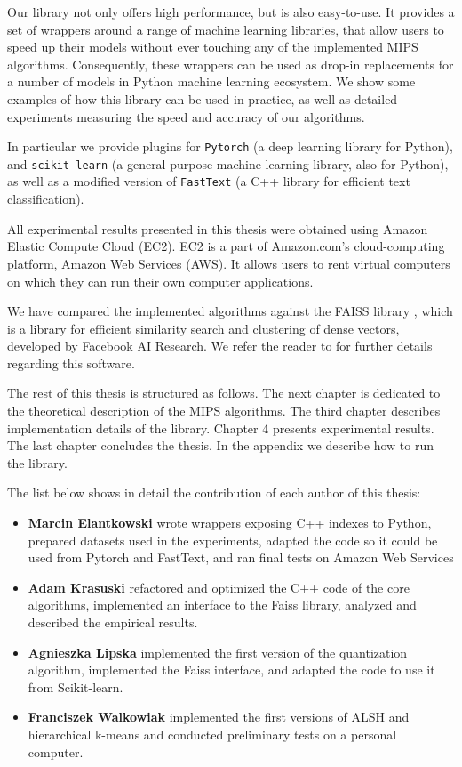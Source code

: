 Our library not only offers high performance, but is also easy-to-use.
It provides a set of wrappers around a range of machine learning libraries, that allow users to
speed up their models without ever touching any of the implemented MIPS algorithms. Consequently,
these wrappers can be used as drop-in replacements for a number of models in Python machine learning ecosystem.
We show some examples of how this library can be used in practice,
as well as detailed experiments measuring the speed and accuracy of our algorithms.

In particular we provide plugins for \texttt{Pytorch} (a deep learning library for Python), and \texttt{scikit-learn}
(a general-purpose machine learning library, also for Python), as well as a modified version of \texttt{FastText}
(a C++ library for efficient text classification).

All experimental results presented in this thesis were obtained using Amazon Elastic Compute Cloud (EC2).
EC2 is a part of Amazon.com's cloud-computing platform, Amazon Web Services (AWS). It allows users to rent virtual
computers on which they can run their own computer applications.

We have compared the implemented algorithms against the FAISS library \cite{faiss}, which is a library for efficient
similarity search and clustering of dense vectors, developed by Facebook AI Research. We refer the reader to
\cite{JDH17} for further details regarding this software.

The rest of this thesis is structured as follows.
The next chapter is dedicated to the theoretical description of the MIPS algorithms.
The third chapter describes implementation details of the library.
Chapter 4 presents experimental results.
The last chapter concludes the thesis.
In the appendix we describe how to run the library.

The list below shows in detail the contribution of each author of this thesis:
\begin{itemize}
    \item \textbf{Marcin Elantkowski} wrote wrappers exposing C++ indexes to Python, prepared datasets used in the
        experiments, adapted the code so it could be used from Pytorch and FastText,
            and ran final tests on Amazon Web Services
    \item \textbf{Adam Krasuski} refactored and optimized the C++ code of the core algorithms,
        implemented an interface to the Faiss library, analyzed and described the empirical results.
    \item \textbf{Agnieszka Lipska} implemented the first version of the quantization algorithm,
        implemented the Faiss interface, and adapted the code to use it from Scikit-learn.
    \item \textbf{Franciszek Walkowiak} implemented the first versions of ALSH and
        hierarchical \mbox{k-means} and conducted preliminary tests on a personal computer.
\end{itemize}

